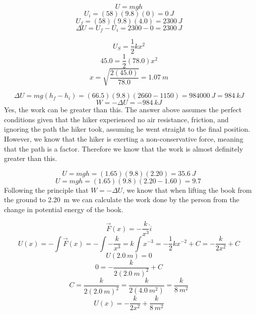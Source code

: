 \documentclass[11pt]{homework}
\begin{document}
\maketitle

\renewcommand{\questiontype}{Problem}
\setcounter{questionCounter}{0}

\question
\[
U = mgh
\]\[
U_i = (58)(9.8)(0) = \qty{0}{J}
\]\[
U_f= (58)(9.8)(4.0) = \qty{2300}{J}
\]\[
\Delta U = U_f - U_i = 2300 - 0 = \boxed{\qty{2300}{J}}
\]

\setcounter{questionCounter}{2}
\question
\[
U_S = \frac{1}{2}kx^2
\]\[
45.0 = \frac{1}{2}(78.0)x^2
\]\[
x = \sqrt{\frac{2(45.0)}{78.0}} = \boxed{\qty{1.07}{m}}
\]

\question
\begin{alphaparts}
    \questionpart
        \[
            \Delta U = mg(h_f-h_i) = (66.5)(9.8)(2660-1150) = \qty{984000}{J} = \boxed{\qty{984}{kJ}}
        \]
    \questionpart
        \[
            W = -\Delta U = \qty{-984}{kJ}
        \]
    \questionpart
        Yes, the work can be greater than this. The answer above assumes the perfect conditions given that the hiker experienced no air resistance, friction, and ignoring the path the hiker took, assuming he went straight to the final position. However, we know that the hiker is exerting a non-conservative force, meaning that the path is a factor. Therefore we know that the work is almost definitely greater than this.
\end{alphaparts}

\setcounter{questionCounter}{5}
\question
\begin{alphaparts}
    \questionpart
        \[
        U = mgh = (1.65)(9.8)(2.20) = \boxed{\qty{35.6}{J}}
        \]
    \questionpart
        \[
        U = mgh = (1.65)(9.8)(2.20-1.60)=\boxed{\qty{9.7}{}}
        \]
    \questionpart
    Following the principle that $W = -\Delta U$, we know that when lifting the book from the ground to \qty{2.20}{m} we can calculate the work done by the person from the change in potential energy of the book.
\end{alphaparts}


\question
\[
\vec{F}(x)=-\frac{k}{x^3}\hat{i}
\]\[
U(x) = -\int \vec{F}(x) = -\int-\frac{k}{x^3}=k \int x^{-3}  = -\frac{1}{2}kx^{-2}+C=-\frac{k}{2x^2}+C
\]\[
U(\qty{2.0}{m})=0
\]\[
0=-\frac{k}{2(\qty{2.0}{m})^2}+C
\]\[
C=\frac{k}{2(\qty{2.0}{m})^2}=\frac{k}{2(\qty{4.0}{m^2})}=\frac{k}{\qty{8}{m^2}}
\]\[
U(x)=\boxed{-\frac{k}{2x^2}+\frac{k}{\qty{8}{m^2}}}
\]
\end{document}
